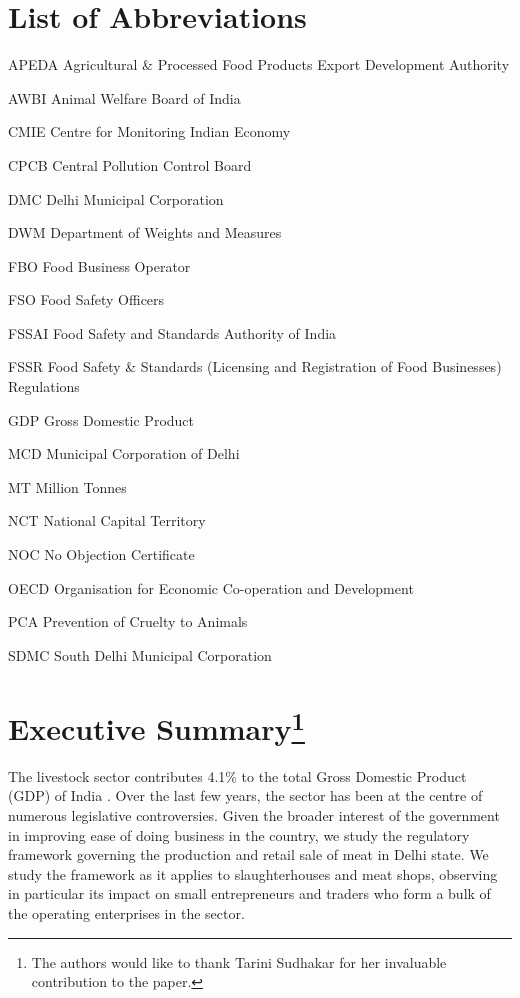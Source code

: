 \documentclass[a4paper, 12pt]{article}
\begin{document}
\section*{List of Abbreviations}
\begin{abbrv}
\item[APEDA] Agricultural \& Processed Food Products Export Development Authority
\item[AWBI] Animal Welfare Board of India
\item[CMIE] Centre for Monitoring Indian Economy
\item[CPCB] Central Pollution Control Board
\item[DMC] Delhi Municipal Corporation
\item[DWM] Department of Weights and Measures
\item[FBO] Food Business Operator
\item[FSO] Food Safety Officers
\item[FSSAI] Food Safety and Standards Authority of India
\item[FSSR] Food Safety \& Standards (Licensing and Registration of Food Businesses) Regulations
\item[GDP] Gross Domestic Product
\item[MCD] Municipal Corporation of Delhi
\item[MT] Million Tonnes
\item[NCT] National Capital Territory
\item[NOC] No Objection Certificate
\item[OECD] Organisation for Economic Co-operation and Development
\item[PCA] Prevention of Cruelty to Animals
\item[SDMC] South Delhi Municipal Corporation 
\end{abbrv}
\newpage
\section*{Executive Summary\footnote{The authors would like to thank Tarini Sudhakar for her invaluable contribution to the paper.}}

The livestock sector contributes 4.1\% to the total Gross Domestic Product (GDP) of India \parencite{economicreport}. Over the last few years, the sector has been at the centre of numerous legislative controversies. Given the broader interest of the government in improving ease of doing business in the country, we study the regulatory framework governing the production and retail sale of meat in Delhi state. We study the framework as it applies to slaughterhouses and meat shops, observing in particular its impact on small entrepreneurs and traders who form a bulk of the operating enterprises in the sector.\\
\end{document}
